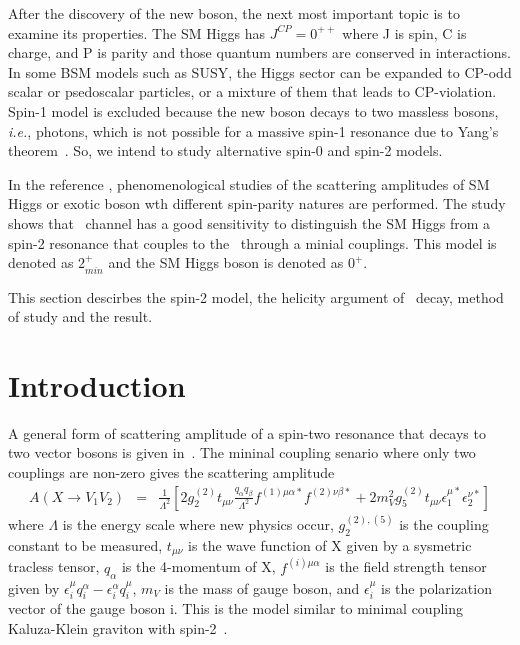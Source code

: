 
After the discovery of the new boson, the next most important topic is to examine its properties. 
The SM Higgs has $J^{CP} = 0^{++}$ where J is spin, C is charge, and P is parity
and those quantum numbers are conserved in interactions. In some BSM models such 
as SUSY, the Higgs sector can be expanded to CP-odd scalar or psedoscalar particles, 
or a mixture of them that leads to CP-violation.
Spin-1 model is excluded because the new boson decays to two massless bosons, 
\textit{i.e.}, photons, which is not possible for a massive spin-1 resonance 
due to Yang's theorem~\cite{PhysRev.77.242}. 
So, we intend to study alternative spin-0 and spin-2 models.   


In the reference \cite{Bolognesi:2012mm}, phenomenological studies of the scattering 
amplitudes of SM Higgs or exotic boson wth different spin-parity natures are performed.  
The study shows that \hww\ channel has a good 
sensitivity to distinguish the SM Higgs from a spin-2 resonance that couples to 
the \ww\ through a minial couplings. This model is denoted as $2_{min}^+$
and the SM Higgs boson is denoted as $0^+$. 

This section descirbes the spin-2 model, the helicity argument 
of \ww\ decay, method of study and the result. 

\section{Introduction} 

A general form of scattering amplitude of a spin-two resonance that decays to two vector 
bosons is given in~\cite{Bolognesi:2012mm}. The mininal coupling senario 
where only two couplings are non-zero gives the scattering amplitude 
\begin{eqnarray} 
A(X \rightarrow V_1V_2)
&=& 
\frac{1}{\Lambda^2}  
\left[ 
2 g_2^{(2)} t_{\mu\nu} \frac{q_\alpha q_\beta}{\Lambda^2} 
f^{(1)\mu\alpha*} f^{(2)\nu\beta*} 
+ 
2 m_V^2 g_5^{(2)} t_{\mu\nu} 
\epsilon^{\mu*}_1 \epsilon^{\nu*}_2 
\right] 
\end{eqnarray} 
where $\Lambda$ is the energy scale where new physics occur, 
$g_2^{(2),(5)}$ is the coupling constant to be measured, 
$t_{\mu\nu}$ is the wave function of X given by a sysmetric tracless tensor, 
$q_{\alpha}$ is the 4-momentum of X, 
$f^{(i)\mu\alpha}$ is the field strength tensor given by 
    $\epsilon_i^\mu q_i^\alpha - \epsilon_i^\alpha q_i^\mu$, 
$m_V$ is the mass of gauge boson, and 
$\epsilon_i^{\mu}$ is the polarization vector of the gauge boson i.
This is the model similar to minimal coupling Kaluza-Klein graviton with spin-2~\cite{}. 

